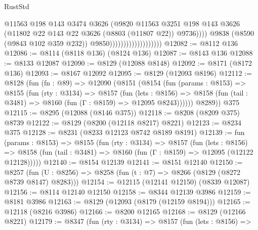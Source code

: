 \begin{lexlean}{RustStd}
\begin{coremodule}
                                              @11563
                                              @198
                                              @143
                                              @3474
                                              @3626
                                              (@9820
                                                @11563
                                                @3251
                                                @198
                                                @143
                                                @3626
                                                (@11802
                                                  @22
                                                  @143
                                                  @22
                                                  @3626
                                                  (@8803 (@11807 @22))
                                                  @9736))))
                                          @9838
                                          (@8590 (@9843 @102 @359 @232))
                                          @9850)))))))))))))))))))
@12082 := @8112 @136
@12086 := @8114 (@8118 @136) (@8124 @136)
@12087 := @8143 @136
@12088 := @8133 @12087
@12090 := @8129 (@12088 @8148)
@12092 := @8171 (@8172 @136)
@12093 := @8167 @12092
@12095 := @8129 (@12093 @8196)
@12112 := @8128
    (fun (fn : @89) =>
    @12090
      (@8151
        (@8154
          (fun (params : @8153) =>
          @8155
            (fun (rty : @3134) =>
            @8157
              (fun (lets : @8156) =>
              @8158 (fun (tail : @3481) => @8160 (fun (Γ : @8159) => @12095 @8243))))))
        @8289))
    @375
@12115 := @8295 (@12088 (@8146 @375))
@12118 := @8208 (@8209 @375) @8739
@12122 := @8129 (@8200 (@12118 @8217) @8221)
@12123 := @8234 @375
@12128 := @8231 (@8233 @12123 @8742 @8189 @8191)
@12139 := fun (params : @8153) =>
  @8155
    (fun (rty : @3134) =>
    @8157
      (fun (lets : @8156) =>
      @8158 (fun (tail : @3481) => @8160 (fun (Γ : @8159) => @12095 (@12122 @12128)))))
@12140 := @8154 @12139
@12141 := @8151 @12140
@12150 := @8257 (fun (U : @8256) => @8258 (fun (t : @7) => @8266 (@8129 (@8272 @8739 @8147) @8283)))
@12154 := @12115 (@12141 @12150) (@8339 @12087)
@12156 := @8114 @12140 @12150
@12158 := @8344 @12139 @3986
@12159 := @8181 @3986
@12163 := @8129 (@12093 (@8179 (@12159 @8194)))
@12165 := @12118 (@8216 @3986)
@12166 := @8200 @12165
@12168 := @8129 (@12166 @8221)
@12179 := @8347
    (fun (rty : @3134) =>
    @8157
      (fun (lets : @8156) =>

\end{coremodule}
\end{lexlean}
